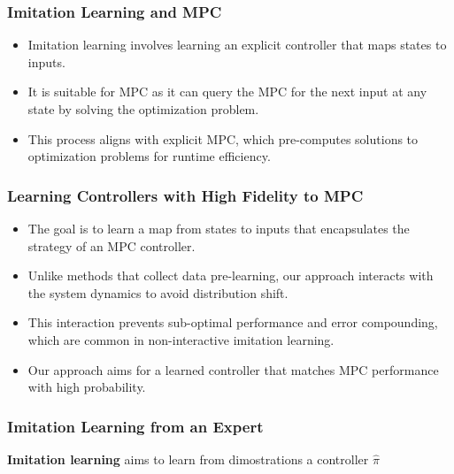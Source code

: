 \documentclass[aspectratio=169,hyperref={pdfpagelabels=false}]{beamer}
\begin{document}
      \begin{frame}
        \frametitle{Imitation Learning and MPC}
        \begin{itemize}
            \item Imitation learning involves learning an explicit controller that maps states to inputs.
            \item It is suitable for MPC as it can query the MPC for the next input at any state by solving the optimization problem.
            \item This process aligns with explicit MPC, which pre-computes solutions to optimization problems for runtime efficiency.
        \end{itemize}
        \end{frame}

        \begin{frame}
          \frametitle{Learning Controllers with High Fidelity to MPC}
          \begin{itemize}
              \item The goal is to learn a map from states to inputs that encapsulates the strategy of an MPC controller.
              \item Unlike methods that collect data pre-learning, our approach interacts with the system dynamics to avoid distribution shift.
              \item This interaction prevents sub-optimal performance and error compounding, which are common in non-interactive imitation learning.
              \item Our approach aims for a learned controller that matches MPC performance with high probability.
          \end{itemize}
          \end{frame}
          
          \begin{frame}
            \frametitle{Imitation Learning from an Expert}
            \begin{block}{}
              \textbf{Imitation learning} aims to learn from dimostrations a controller ${\hat{\pi}}$
            \end{block}
            \end{frame}
            
    
\end{document}
